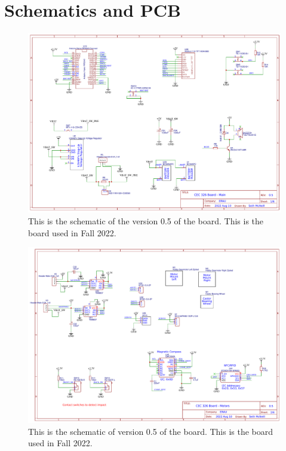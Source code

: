 \section{Schematics and PCB}
\begin{landscape}
\begin{figure}[!htb]
	\centering
	\includegraphics[width=\paperwidth]{arduinoStart/Schematic_CEC326v0.5_Main} %
	\caption{This is the schematic of the version 0.5 of the board. This is the board used in Fall 2022.}
	\label{fig:boardSchematic1}
\end{figure} 

\begin{figure}[!htb]
	\centering
	\includegraphics[width=\paperwidth]{arduinoStart/Schematic_CEC326v0.5_Motors} %
	\caption{This is the schematic of version 0.5 of the board. This is the board used in Fall 2022.}
	\label{fig:boardSchematic2}
\end{figure} 


\end{landscape}
